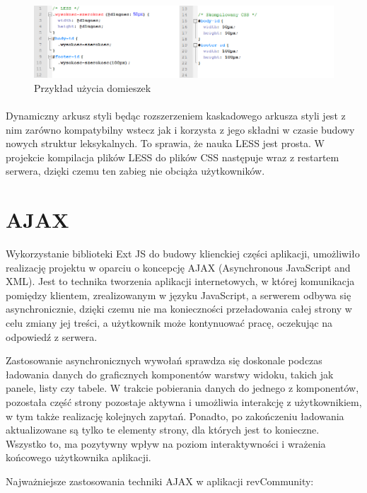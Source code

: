 \begin{figure}[h]
	\centering
	\includegraphics[width=1.00\textwidth]{images/less2.png}
	\caption{Przykład użycia domieszek}
\end{figure}
\paragraph{}

Dynamiczny arkusz styli  będąc rozszerzeniem kaskadowego arkusza styli jest z nim zarówno kompatybilny wstecz jak i korzysta z jego składni w czasie budowy nowych struktur leksykalnych. To sprawia, że nauka LESS jest prosta.
W projekcie kompilacja plików LESS do plików CSS następuje wraz z restartem serwera, dzięki czemu ten zabieg nie obciąża użytkowników. 


\section{AJAX}
Wykorzystanie biblioteki Ext JS do budowy klienckiej części aplikacji, umożliwiło realizację projektu w oparciu o koncepcję AJAX (Asynchronous JavaScript and XML). Jest to technika tworzenia aplikacji internetowych, w której komunikacja pomiędzy klientem, zrealizowanym w języku JavaScript, a serwerem odbywa się asynchronicznie, dzięki czemu nie ma konieczności przeładowania całej strony w celu zmiany jej treści, a użytkownik może kontynuować pracę, oczekując na odpowiedź z serwera.\cite{ajaxWoj}

Zastosowanie asynchronicznych wywołań sprawdza się doskonale podczas ładowania danych do graficznych komponentów warstwy widoku, takich jak panele, listy czy tabele. W trakcie pobierania danych do jednego z komponentów, pozostała część strony pozostaje aktywna i umożliwia interakcję z użytkownikiem, w tym także realizację kolejnych zapytań. Ponadto, po zakończeniu ładowania aktualizowane są tylko te elementy strony, dla których jest to konieczne. Wszystko to, ma pozytywny wpływ na poziom interaktywności i wrażenia końcowego użytkownika aplikacji.

Najważniejsze zastosowania techniki AJAX w aplikacji revCommunity:

